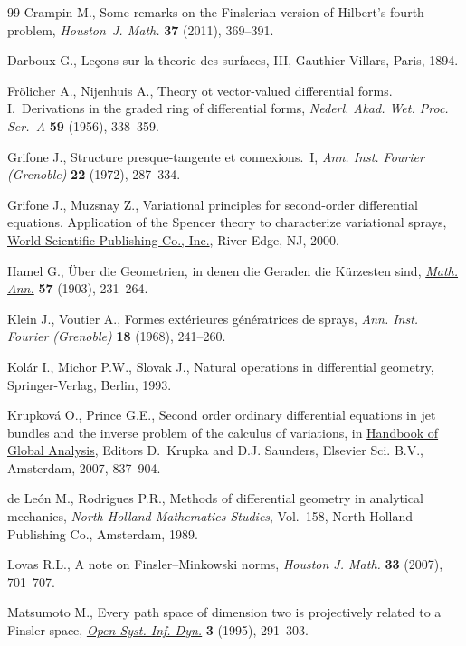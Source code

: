 \begin{thebibliography}{99}
Crampin M.,
Some remarks on the Finslerian version of Hilbert's fourth problem,
{\it Houston~J. Math.}   {\bf 37} (2011), 369--391.

Darboux G.,
Le\c cons sur la theorie des surfaces, III,
Gauthier-Villars, Paris, 1894.

Fr\"olicher A., Nijenhuis A.,
Theory ot vector-valued dif\/ferential forms. I.~Derivations in the graded ring of dif\/ferential forms,
{\it Nederl. Akad. Wet. Proc. Ser.~A} {\bf 59} (1956), 338--359.

Grifone J.,
Structure presque-tangente et connexions.~I,
{\it Ann. Inst. Fourier (Grenoble)} {\bf 22}  (1972), 287--334.

Grifone J., Muzsnay Z.,
Variational principles for second-order dif\/ferential equations. Application of the Spencer theory to characterize variational sprays,
\href{http://dx.doi.org/10.1142/9789812813596}{World Scientif\/ic Publishing Co., Inc.}, River Edge, NJ, 2000.

Hamel G.,
\"Uber die Geometrien, in denen die Geraden die K\"urzesten sind,
\href{http://dx.doi.org/10.1007/BF01444348}{{\it Math. Ann.}} {\bf 57} (1903), 231--264.

Klein J.,  Voutier A.,
Formes ext\'erieures g\'en\'eratrices de sprays,
{\it Ann. Inst. Fourier (Grenoble)} {\bf 18} (1968), 241--260.

Kol\'ar I., Michor P.W., Slovak J.,
Natural operations in dif\/ferential geometry,
Springer-Verlag, Berlin, 1993.

Krupkov\'a O., Prince G.E.,
Second order ordinary dif\/ferential equations in jet bundles and the inverse  problem of the calculus of variations,
 in \href{http://dx.doi.org/10.1016/B978-044452833-9.50017-6}{Handbook of Global Analysis}, Editors D.~Krupka and D.J. Saunders,   Elsevier Sci. B.V., Amsterdam,  2007, 837--904.

de Le\'on M., Rodrigues P.R.,
Methods of dif\/ferential geometry in analytical mechanics,
{\it North-Holland Mathematics Studies}, Vol.~158, North-Holland Publishing Co., Amsterdam, 1989.

Lovas R.L.,
A note on Finsler--Minkowski norms,
{\it Houston J. Math.}  {\bf 33} (2007), 701--707.

Matsumoto M.,
Every path space of dimension two is projectively related to a Finsler space,
\href{http://dx.doi.org/10.1007/BF02228993}{{\it Open Syst. Inf. Dyn.}} {\bf 3} (1995), 291--303.


\end{thebibliography}
